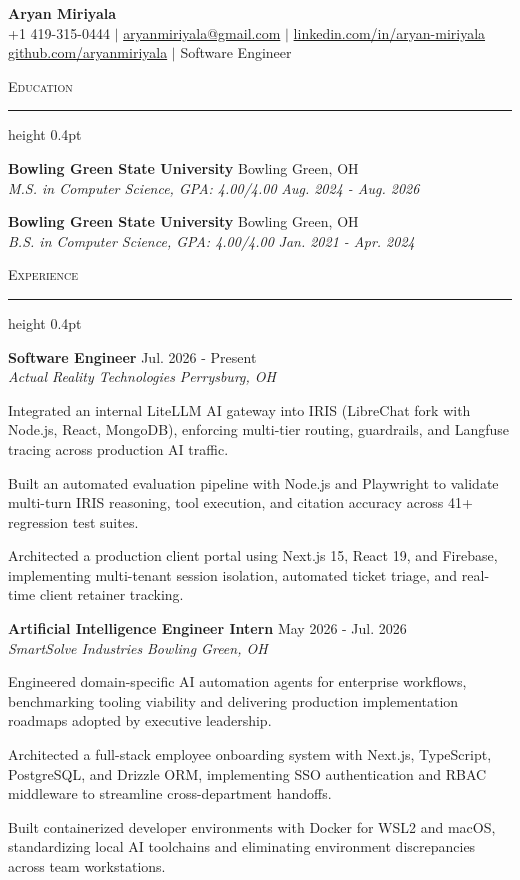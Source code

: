 \documentclass[letterpaper,11pt]{article}
\newcommand{\resumesection}[1]{%
  \par\vspace{2pt}%
  {\large\scshape #1}\par\vspace{2pt}%
  \hrule height 0.4pt\vspace{2pt}%
}
\newcommand{\resumeSubheading}[4]{
  \textbf{#1} \hfill #2\\
  \textit{#3} \hfill \textit{#4}
}
\begin{document}
\begin{center}
  {\LARGE \textbf{Aryan Miriyala}}\\[2pt]
  \small
  +1 419-315-0444 $|$ \href{mailto:aryanmiriyala@gmail.com}{aryanmiriyala@gmail.com} $|$ \href{https://www.linkedin.com/in/aryan-miriyala-7788a21b6/}{linkedin.com/in/aryan-miriyala}\\
  \href{https://github.com/aryanmiriyala}{github.com/aryanmiriyala} $|$ Software Engineer
\end{center}\vspace{-6pt}

\resumesection{Education}
\resumeSubheading
{Bowling Green State University}{Bowling Green, OH}
{M.S. in Computer Science, GPA: 4.00/4.00}{Aug. 2024 - Aug. 2026}

\resumeSubheading
{Bowling Green State University}{Bowling Green, OH}
{B.S. in Computer Science, GPA: 4.00/4.00}{Jan. 2021 - Apr. 2024}

\resumesection{Experience}
\resumeSubheading
{Software Engineer}{Jul. 2026 - Present}
{Actual Reality Technologies}{Perrysburg, OH}
\begin{tightitemize}
  \item Integrated an internal LiteLLM AI gateway into IRIS (LibreChat fork with Node.js, React, MongoDB), enforcing multi-tier routing, guardrails, and Langfuse tracing across production AI traffic.
  \item Built an automated evaluation pipeline with Node.js and Playwright to validate multi-turn IRIS reasoning, tool execution, and citation accuracy across 41+ regression test suites.
  \item Architected a production client portal using Next.js 15, React 19, and Firebase, implementing multi-tenant session isolation, automated ticket triage, and real-time client retainer tracking.
\end{tightitemize}

\resumeSubheading
{Artificial Intelligence Engineer Intern}{May 2026 - Jul. 2026}
{SmartSolve Industries}{Bowling Green, OH}
\begin{tightitemize}
  \item Engineered domain-specific AI automation agents for enterprise workflows, benchmarking tooling viability and delivering production implementation roadmaps adopted by executive leadership.
  \item Architected a full-stack employee onboarding system with Next.js, TypeScript, PostgreSQL, and Drizzle ORM, implementing SSO authentication and RBAC middleware to streamline cross-department handoffs.
  \item Built containerized developer environments with Docker for WSL2 and macOS, standardizing local AI toolchains and eliminating environment discrepancies across team workstations.
\end{tightitemize}
\end{document}
